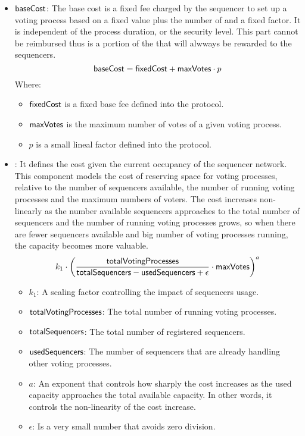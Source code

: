 \begin{itemize}
	\item ${\sf{baseCost}}$: The base cost is a fixed fee charged by the sequencer to set up a voting process based on a fixed value plus the number of and a fixed factor. It is independent of the process duration, or the security level. This part cannot be reimbursed thus is a portion of the that will alwways be rewarded to the sequencers.
	$$ {\sf{baseCost}} = {\sf{fixedCost}} + {\sf{maxVotes}} \cdot p $$
	Where:
	\begin{itemize}
		\item ${\sf{fixedCost}}$ is a fixed base fee defined into the protocol.
		\item ${\sf{maxVotes}}$ is the maximum number of votes of a given voting process.
		\item $p$ is a small lineal factor defined into the protocol.
	\end{itemize}
	
	\item \capacityCost: It defines the cost given the current occupancy of the sequencer network. This component models the cost of reserving space for voting processes, relative to the number of sequencers available, the number of running voting processes and the maximum numbers of voters. The cost increases non-linearly as the number available sequencers approaches to the total number of sequencers and the number of running voting processes grows, so when there are fewer sequencers available and big number of voting processes running, the capacity becomes more valuable.
	$$
	k_1 \cdot \left( \frac{{\sf{totalVotingProcesses}}}{{\sf{totalSequencers}} - {\sf{usedSequencers}} + \epsilon} \cdot {\sf{maxVotes}} \right)^a
	$$ 
	\begin{itemize}
		\item $k_1$: A scaling factor controlling the impact of sequencers usage.
		\item ${\sf{totalVotingProcesses}}$: The total number of running voting processes.
		\item ${\sf{totalSequencers}}$: The total number of registered sequencers.
		\item ${\sf{usedSequencers}}$: The number of sequencers that are already handling other voting processes.
		\item $a$: An exponent that controls how sharply the cost increases as the used capacity approaches the total available capacity. In other words, it controls the non-linearity of the cost increase.
		\item $\epsilon$: Is a very small number that avoids zero division.
	\end{itemize}
	

\end{itemize}
